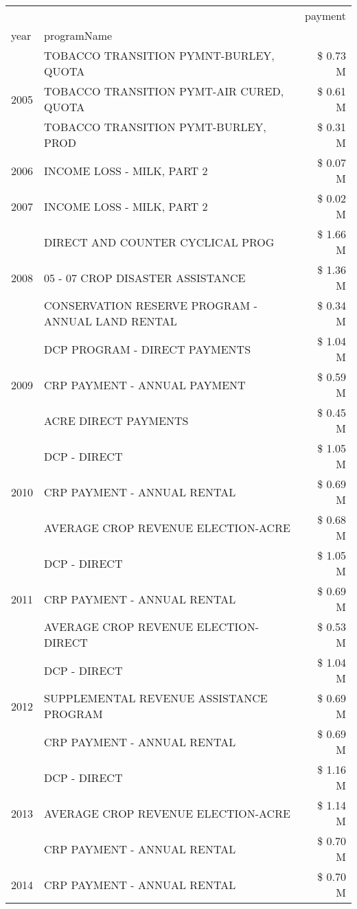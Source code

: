 \begin{tabular}{llr}
\toprule
 &  & payment \\
year & programName &  \\
\midrule
\multirow[t]{3}{*}{2005} & TOBACCO TRANSITION PYMNT-BURLEY, QUOTA & \$ 0.73 M \\
 & TOBACCO TRANSITION PYMT-AIR CURED, QUOTA & \$ 0.61 M \\
 & TOBACCO TRANSITION PYMT-BURLEY, PROD & \$ 0.31 M \\
\cline{1-3}
2006 & INCOME LOSS - MILK, PART 2 & \$ 0.07 M \\
\cline{1-3}
2007 & INCOME LOSS - MILK, PART 2 & \$ 0.02 M \\
\cline{1-3}
\multirow[t]{3}{*}{2008} & DIRECT AND COUNTER CYCLICAL PROG & \$ 1.66 M \\
 & 05 - 07 CROP DISASTER ASSISTANCE & \$ 1.36 M \\
 & CONSERVATION RESERVE PROGRAM - ANNUAL LAND RENTAL & \$ 0.34 M \\
\cline{1-3}
\multirow[t]{3}{*}{2009} & DCP PROGRAM - DIRECT PAYMENTS & \$ 1.04 M \\
 & CRP PAYMENT - ANNUAL PAYMENT & \$ 0.59 M \\
 & ACRE DIRECT PAYMENTS & \$ 0.45 M \\
\cline{1-3}
\multirow[t]{3}{*}{2010} & DCP - DIRECT & \$ 1.05 M \\
 & CRP PAYMENT - ANNUAL RENTAL & \$ 0.69 M \\
 & AVERAGE CROP REVENUE ELECTION-ACRE & \$ 0.68 M \\
\cline{1-3}
\multirow[t]{3}{*}{2011} & DCP - DIRECT & \$ 1.05 M \\
 & CRP PAYMENT - ANNUAL RENTAL & \$ 0.69 M \\
 & AVERAGE CROP REVENUE ELECTION-DIRECT & \$ 0.53 M \\
\cline{1-3}
\multirow[t]{3}{*}{2012} & DCP - DIRECT & \$ 1.04 M \\
 & SUPPLEMENTAL REVENUE ASSISTANCE PROGRAM & \$ 0.69 M \\
 & CRP PAYMENT - ANNUAL RENTAL & \$ 0.69 M \\
\cline{1-3}
\multirow[t]{3}{*}{2013} & DCP - DIRECT & \$ 1.16 M \\
 & AVERAGE CROP REVENUE ELECTION-ACRE & \$ 1.14 M \\
 & CRP PAYMENT - ANNUAL RENTAL & \$ 0.70 M \\
\cline{1-3}
\multirow[t]{3}{*}{2014} & CRP PAYMENT - ANNUAL RENTAL & \$ 0.70 M \\

\end{tabular}
